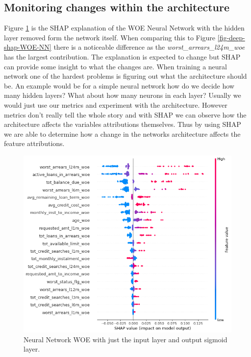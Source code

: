 \subsection{Monitoring changes within the architecture} \label{sect-architecure}
Figure \ref{fig-deep-shap-WOE-sig} is the SHAP explanation of the WOE Neural Network with the hidden layer removed form the network itself. When comparing this to Figure \ref{fig-deep-shap-WOE-NN} there is a noticeable difference as the \emph{worst\_arrears\_l24m\_woe} has the largest contribution. The explanation is expected to change but SHAP can provide some insight to what the changes are. When training a neural network one of the hardest problems is figuring out what the architecture should be. An example would be for a simple neural network how do we decide how many hidden layers? What about how many neurons in each layer? Usually we would just use our metrics and experiment with the architecture. However metrics don't really tell the whole story and with SHAP we can observe how the architecture affects the variables attributions themselves. Thus by using SHAP we are able to determine how a change in the networks architecture affects the feature attributions. 
\begin{figure}[!htpb]
\centering
  \includegraphics[width=0.8\linewidth]{Credit_Images/Sigmoid_nn_shap.png}
   \caption{Neural Network WOE with just the input layer and output sigmoid layer.}
    \label{fig-deep-shap-WOE-sig}
\end{figure}

